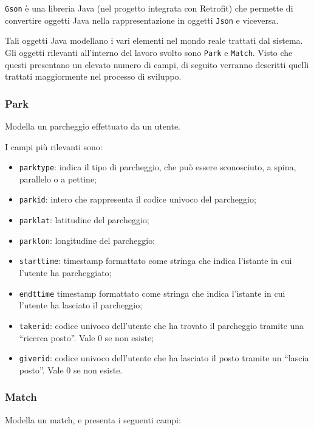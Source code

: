 \texttt{Gson} è una libreria Java (nel progetto integrata con Retrofit) che permette di convertire oggetti Java nella rappresentazione in oggetti \texttt{Json} e viceversa.

Tali oggetti Java modellano i vari elementi nel mondo reale trattati dal sistema. Gli oggetti rilevanti all'interno del lavoro svolto sono \texttt{Park} e \texttt{Match}. Visto che questi presentano un elevato numero di campi, di seguito verranno descritti quelli trattati maggiormente nel processo di sviluppo.

\hypertarget{park}{%
\subsubsection{Park}\label{park}}

Modella un parcheggio effettuato da un utente.

I campi più rilevanti sono:

\begin{itemize}
    \item \texttt{parktype}: indica il tipo di parcheggio, che può essere sconosciuto, a spina, parallelo o a pettine;
    \item \texttt{parkid}: intero che rappresenta il codice univoco del parcheggio;
    \item \texttt{parklat}: latitudine del parcheggio;
    \item \texttt{parklon}: longitudine del parcheggio;
    \item \texttt{starttime}: timestamp formattato come stringa che indica l'istante in cui l'utente ha parcheggiato;
    \item \texttt{endttime} timestamp formattato come stringa che indica l'istante in cui l'utente ha lasciato il parcheggio;
    \item \texttt{takerid}: codice univoco dell'utente che ha trovato il parcheggio tramite una ``ricerca posto''. Vale 0 se non esiste;
    \item \texttt{giverid}: codice univoco dell'utente che ha lasciato il posto tramite un ``lascia posto''. Vale 0 se non esiste.
\end{itemize}
\hypertarget{match}{%
\subsubsection{Match}\label{match}}

Modella un match, e presenta i seguenti campi:

